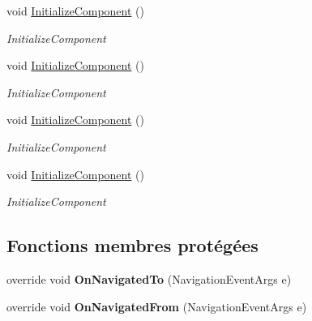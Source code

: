 \begin{DoxyCompactItemize}
void \hyperlink{class_pumgrana_1_1_show_content_a705f41b53bc886cefddb019800d781a6}{Initialize\+Component} ()
\begin{DoxyCompactList}\small\item\em Initialize\+Component \end{DoxyCompactList}\item 
void \hyperlink{class_pumgrana_1_1_show_content_a705f41b53bc886cefddb019800d781a6}{Initialize\+Component} ()
\begin{DoxyCompactList}\small\item\em Initialize\+Component \end{DoxyCompactList}\item 
void \hyperlink{class_pumgrana_1_1_show_content_a705f41b53bc886cefddb019800d781a6}{Initialize\+Component} ()
\begin{DoxyCompactList}\small\item\em Initialize\+Component \end{DoxyCompactList}\item 
void \hyperlink{class_pumgrana_1_1_show_content_a705f41b53bc886cefddb019800d781a6}{Initialize\+Component} ()
\begin{DoxyCompactList}\small\item\em Initialize\+Component \end{DoxyCompactList}\end{DoxyCompactItemize}
\subsection*{Fonctions membres protégées}
\begin{DoxyCompactItemize}
\item 
\hypertarget{class_pumgrana_1_1_show_content_aca348197e932ebe184100413d0401ab8}{override void {\bfseries On\+Navigated\+To} (Navigation\+Event\+Args e)}\label{class_pumgrana_1_1_show_content_aca348197e932ebe184100413d0401ab8}

\item 
\hypertarget{class_pumgrana_1_1_show_content_ad7384fc9f8beec3d148d33ea3522e82f}{override void {\bfseries On\+Navigated\+From} (Navigation\+Event\+Args e)}\label{class_pumgrana_1_1_show_content_ad7384fc9f8beec3d148d33ea3522e82f}

\end{DoxyCompactItemize}


